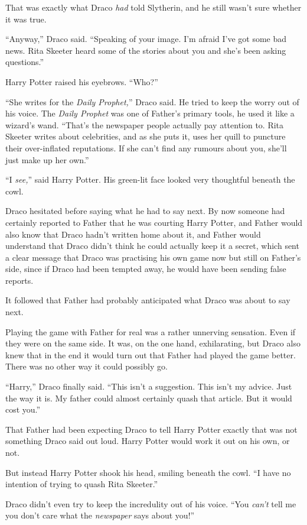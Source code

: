 That was exactly what Draco \emph{had} told Slytherin, and he still wasn’t sure whether it was true.

“Anyway,” Draco said. “Speaking of your image. I’m afraid I’ve got some bad news. Rita Skeeter heard some of the stories about you and she’s been asking questions.”

Harry Potter raised his eyebrows. “Who?”

“She writes for the \emph{Daily Prophet,}” Draco said. He tried to keep the worry out of his voice. The \emph{Daily Prophet} was one of Father’s primary tools, he used it like a wizard’s wand. “That’s the newspaper people actually pay attention to. Rita Skeeter writes about celebrities, and as she puts it, uses her quill to puncture their over-inflated reputations. If she can’t find any rumours about you, she’ll just make up her own.”

“I \emph{see,}” said Harry Potter. His green-lit face looked very thoughtful beneath the cowl.

Draco hesitated before saying what he had to say next. By now someone had certainly reported to Father that he was courting Harry Potter, and Father would also know that Draco hadn’t written home about it, and Father would understand that Draco didn’t think he could actually keep it a secret, which sent a clear message that Draco was practising his own game now but still on Father’s side, since if Draco had been tempted away, he would have been sending false reports.

It followed that Father had probably anticipated what Draco was about to say next.

Playing the game with Father for real was a rather unnerving sensation. Even if they were on the same side. It was, on the one hand, exhilarating, but Draco also knew that in the end it would turn out that Father had played the game better. There was no other way it could possibly go.

“Harry,” Draco finally said. “This isn’t a suggestion. This isn’t my advice. Just the way it is. My father could almost certainly quash that article. But it would cost you.”

That Father had been expecting Draco to tell Harry Potter exactly that was not something Draco said out loud. Harry Potter would work it out on his own, or not.

But instead Harry Potter shook his head, smiling beneath the cowl. “I have no intention of trying to quash Rita Skeeter.”

Draco didn’t even try to keep the incredulity out of his voice. “You \emph{can’t} tell me you don’t care what the \emph{newspaper} says about you!”

